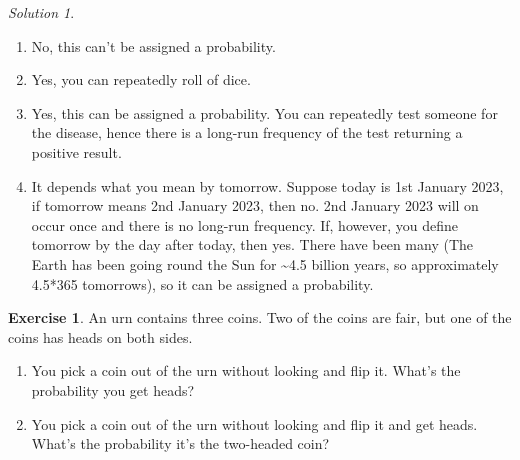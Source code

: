 \documentclass[
]{book}
\providecommand{\tightlist}{%
  \setlength{\itemsep}{0pt}\setlength{\parskip}{0pt}}
\theoremstyle{definition}
\theoremstyle{definition}
\theoremstyle{definition}
\newtheorem{exercise}{Exercise}[chapter]
\theoremstyle{definition}
\theoremstyle{remark}
\newtheorem*{solution}{Solution}
\begin{document}
\begin{solution}

\begin{enumerate}
\def\labelenumi{\arabic{enumi}.}
\tightlist
\item
  No, this can't be assigned a probability.
\item
  Yes, you can repeatedly roll of dice.
\item
  Yes, this can be assigned a probability. You can repeatedly test someone for the disease, hence there is a long-run frequency of the test returning a positive result.
\item
  It depends what you mean by tomorrow. Suppose today is 1st January 2023, if tomorrow means 2nd January 2023, then no. 2nd January 2023 will on occur once and there is no long-run frequency. If, however, you define tomorrow by the day after today, then yes. There have been many (The Earth has been going round the Sun for \textasciitilde4.5 billion years, so approximately 4.5*365 tomorrows), so it can be assigned a probability.
\end{enumerate}

\end{solution}

\begin{exercise}

An urn contains three coins. Two of the coins are fair, but one of the coins has heads on both sides.

\begin{enumerate}
\def\labelenumi{\arabic{enumi}.}
\tightlist
\item
  You pick a coin out of the urn without looking and flip it. What's the probability you get heads?
\item
  You pick a coin out of the urn without looking and flip it and get heads. What's the probability it's the two-headed coin?
\end{enumerate}

\end{exercise}
\end{document}

